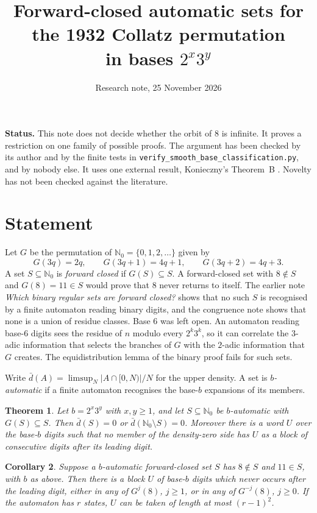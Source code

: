 \documentclass[11pt]{article}
\title{Forward-closed automatic sets for the 1932 Collatz permutation\\
in bases $2^x3^y$}
\author{Research note, 25 November 2026}
\date{}
\newtheorem{theorem}{Theorem}
\newtheorem{corollary}[theorem]{Corollary}
\theoremstyle{remark}
\newcommand{\N}{\mathbb{N}_0}
\newcommand{\ud}{\bar d}
\begin{document}
\maketitle

\noindent\textbf{Status.} This note does not decide whether the orbit of $8$ is
infinite. It proves a restriction on one family of possible proofs. The argument
has been checked by its author and by the finite tests in
\texttt{verify\_smooth\_base\_classification.py}, and by nobody else. It uses one
external result, Konieczny's Theorem~B \cite{K}. Novelty has not been checked
against the literature.

\section{Statement}

Let $G$ be the permutation of $\N=\{0,1,2,\dots\}$ given by
\[
G(3q)=2q,\qquad G(3q+1)=4q+1,\qquad G(3q+2)=4q+3 .
\]
A set $S\subseteq\N$ is \emph{forward closed} if $G(S)\subseteq S$. A forward-closed
set with $8\notin S$ and $G(8)=11\in S$ would prove that $8$ never returns to
itself. The earlier note \emph{Which binary regular sets are forward closed?}
shows that no such $S$ is recognised by a finite automaton reading binary
digits, and the congruence note shows that none is a union of residue classes.
Base $6$ was left open. An automaton reading base-$6$ digits sees the residue of
$n$ modulo every $2^k3^k$, so it can correlate the $3$-adic information that
selects the branches of $G$ with the $2$-adic information that $G$ creates. The
equidistribution lemma of the binary proof fails for such sets.

Write $\ud(A)=\limsup_N |A\cap[0,N)|/N$ for the upper density. A set is
\emph{$b$-automatic} if a finite automaton recognises the base-$b$ expansions of
its members.

\begin{theorem}\label{main}
Let $b=2^x3^y$ with $x,y\ge 1$, and let $S\subseteq\N$ be $b$-automatic with
$G(S)\subseteq S$. Then $\ud(S)=0$ or $\ud(\N\setminus S)=0$. Moreover there is
a word $U$ over the base-$b$ digits such that no member of the density-zero
side has $U$ as a block of consecutive digits after its leading digit.
\end{theorem}

\begin{corollary}\label{eight}
Suppose a $b$-automatic forward-closed set $S$ has $8\notin S$ and $11\in S$,
with $b$ as above. Then there is a block $U$ of base-$b$ digits which never occurs
after the leading digit, either in any of $G^j(8)$, $j\ge 1$, or in any of
$G^{-j}(8)$, $j\ge 0$. If the automaton has $r$ states, $U$ can be taken of
length at most $(r-1)^2$.
\end{corollary}
\end{document}
